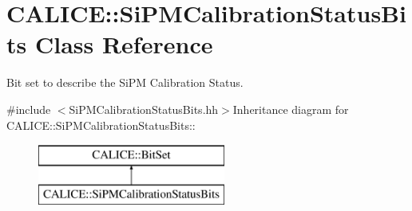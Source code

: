 \section{CALICE::SiPMCalibrationStatusBits Class Reference}
\label{classCALICE_1_1SiPMCalibrationStatusBits}


Bit set to describe the SiPM Calibration Status.  


{\ttfamily \#include $<$SiPMCalibrationStatusBits.hh$>$}Inheritance diagram for CALICE::SiPMCalibrationStatusBits::\begin{figure}[H]
\begin{center}
\leavevmode
\includegraphics[height=2cm]{classCALICE_1_1SiPMCalibrationStatusBits}
\end{center}
\end{figure}
